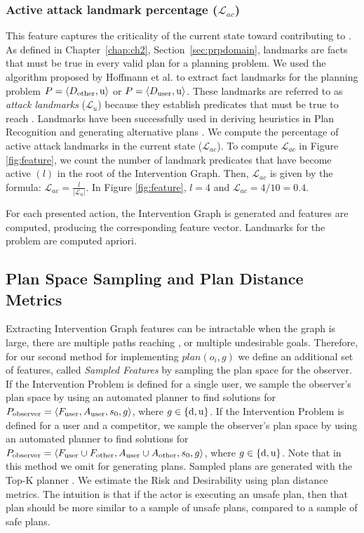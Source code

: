 \subsubsection{Active attack landmark percentage ($\mathcal{L}_{ac}$)} 
This feature captures the criticality of the current state toward contributing to \undesired. 
As defined in Chapter~\ref{chap:ch2}, Section~\ref{sec:prpdomain}, landmarks are facts that must be true in every valid plan for a planning problem.
We used the algorithm proposed by Hoffmann et al. \citeyear{hoffman2004lm} to extract fact landmarks for the planning problem $P = \langle D_{\textnormal{other}}, \mathrm{u}\rangle$ or $P = \langle D_{\textnormal{user}}, \mathrm{u}\rangle$. 
These landmarks are referred to as \textit{attack landmarks} ($\mathcal{L}_{u}$) because they establish predicates that must be true to reach \undesired.  
Landmarks have been successfully used in deriving heuristics in Plan Recognition \cite{vered2018goalrec} and generating alternative plans \cite{bryce2014diverse}. 
We compute the percentage of active attack landmarks in the current state ($\mathcal{L}_{ac}$). 
To compute $\mathcal{L}_{ac}$ in Figure \ref{fig:feature}, we count the number of landmark predicates that have become active $(l)$ in the root of the Intervention Graph. 
Then, $\mathcal{L}_{ac}$ is given by the formula: $\mathcal{L}_{ac} = \frac{l}{\left |\mathcal{L}_{u}\right|}$. In Figure \ref{fig:feature}, $l=4$ and $\mathcal{L}_{ac}=4/10=0.4$.

For each presented action, the Intervention Graph is generated and features are computed, producing the corresponding feature vector. Landmarks for the problem are computed apriori.

\subsection{Plan Space Sampling and Plan Distance Metrics}
\label{sec:planspacesampling}
Extracting Intervention Graph features can be intractable when the graph is large, there are multiple paths reaching \desired, or multiple undesirable goals. 
Therefore, for our second method for implementing $plan(o_i,g)$ we define an additional set of features, called \textit{Sampled Features} by sampling the plan space for the observer.
If the Intervention Problem is defined for a single user, we sample the observer's plan space by using an automated planner to find solutions for $P_{\textnormal{observer}}=\langle F_{\textnormal{user}},A_{\textnormal{user}}, s_0, g\rangle$, where $g\in\lbrace \mathrm{d},\mathrm{u} \rbrace$.
If the Intervention Problem is defined for a user and a competitor, we sample the observer's plan space by using an automated planner to find solutions for $P_{\textnormal{observer}}=\langle F_{\textnormal{user}} \cup F_{\textnormal{other}},A_{\textnormal{user}}\cup A_{\textnormal{other}}, s_0, g\rangle$, where $g\in\lbrace \mathrm{d},\mathrm{u} \rbrace$. 
Note that in this method we omit \dandu for generating plans.
Sampled plans are generated with the Top-K planner \cite{riabov2014}. 
We estimate the Risk and Desirability using plan distance metrics. The intuition is that if the actor is executing an unsafe plan, then that plan should be more similar to a sample of unsafe plans, compared to a sample of safe plans. 


